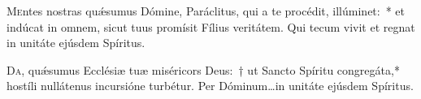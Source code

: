 \documentclass[vesperale_romanum.tex]{subfiles}
\begin{document}

\oratio

\lettrine{M}{e}ntes nostras quǽsumus Dómine, Paráclitus, qui a te procédit, illúminet:~* et indúcat in omnem, sicut tuus promísit Fílius veritátem. Qui tecum vivit et regnat in unitáte ejúsdem Spíritus.








\oratio

\lettrine{D}{a}, quǽsumus Ecclésiæ tuæ miséricors Deus:~† ut Sancto Spíritu congregáta,* hostíli nullátenus incursióne turbétur. Per Dóminum…in unitáte ejúsdem Spíritus.

\biggerrule
         
\end{document}
